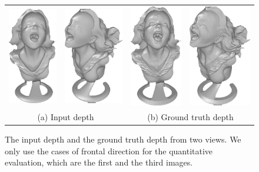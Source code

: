 \begin{figure}[!ht]
\centering
\setlength{\tabcolsep}{2.2em} %
 {\renewcommand{\arraystretch}{0.9}%
\begin{tabular}{c c | c c}
   \includegraphics[height = 0.28\linewidth]{figures/result/comp_input_shape.pdf}&
   \includegraphics[height = 0.28\linewidth]{figures/result/comp_input_shape_side.pdf}  &
   \includegraphics[height = 0.28\linewidth]{figures/result/comp_gt_shape.pdf}  &
   \includegraphics[height = 0.28\linewidth]{figures/result/comp_gt_shape_side.pdf}  \\
\multicolumn{2}{c}{\small (a) Input depth} & \multicolumn{2}{c}{\small (b) Ground truth depth}\\
 \end{tabular}}
\caption{The input depth and the ground truth depth from two views. We only use the cases of frontal direction for the quantitative evaluation, which are the first and the third images.}
\label{fig:result_depth}
\end{figure}
